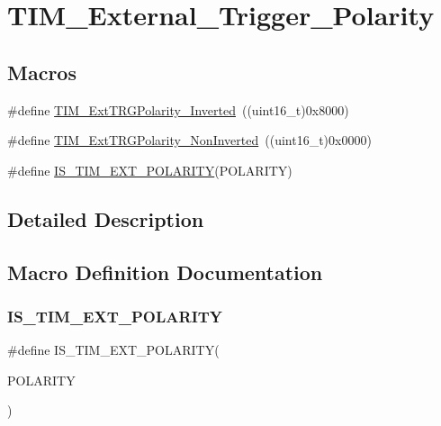 \hypertarget{group___t_i_m___external___trigger___polarity}{}\section{T\+I\+M\+\_\+\+External\+\_\+\+Trigger\+\_\+\+Polarity}
\label{group___t_i_m___external___trigger___polarity}
\subsection*{Macros}
\begin{DoxyCompactItemize}
\item 
\#define \mbox{\hyperlink{group___t_i_m___external___trigger___polarity_ga96f3959a02c0491ab8d65cfa384ce7e3}{T\+I\+M\+\_\+\+Ext\+T\+R\+G\+Polarity\+\_\+\+Inverted}}~((uint16\+\_\+t)0x8000)
\item 
\#define \mbox{\hyperlink{group___t_i_m___external___trigger___polarity_ga63fe7c58c491d2a812d5621b71c2d0c5}{T\+I\+M\+\_\+\+Ext\+T\+R\+G\+Polarity\+\_\+\+Non\+Inverted}}~((uint16\+\_\+t)0x0000)
\item 
\#define \mbox{\hyperlink{group___t_i_m___external___trigger___polarity_ga489ea1fed28375dec49cf1b8dfac47ca}{I\+S\+\_\+\+T\+I\+M\+\_\+\+E\+X\+T\+\_\+\+P\+O\+L\+A\+R\+I\+TY}}(P\+O\+L\+A\+R\+I\+TY)
\end{DoxyCompactItemize}


\subsection{Detailed Description}


\subsection{Macro Definition Documentation}
\mbox{\label{group___t_i_m___external___trigger___polarity_ga489ea1fed28375dec49cf1b8dfac47ca}} 
\subsubsection{\texorpdfstring{IS\_TIM\_EXT\_POLARITY}{IS\_TIM\_EXT\_POLARITY}}
{\footnotesize\ttfamily \#define I\+S\+\_\+\+T\+I\+M\+\_\+\+E\+X\+T\+\_\+\+P\+O\+L\+A\+R\+I\+TY(\begin{DoxyParamCaption}\item[{}]{P\+O\+L\+A\+R\+I\+TY }\end{DoxyParamCaption})}

